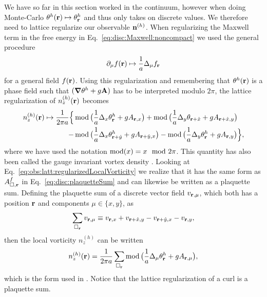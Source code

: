 We have so far in this section worked in the continuum, however when doing Monte-Carlo
$\theta^h({\boldsymbol{\mathbf{r}}}) \mapsto \theta^h_{\boldsymbol{\mathbf{r}}}$ and thus only takes on discrete values. 
We therefore need to lattice regularize our observable ${\boldsymbol{\mathbf{n}}}^{(h)}$. When regularizing
the Maxwell term in the free energy in Eq.~\eqref{eq:disc:Maxwell:noncompact} we used the general
procedure
\begin{equation}
  \partial_\mu f({\boldsymbol{\mathbf{r}}}) \mapsto \frac{1}{a}\Delta_\mu f_{\boldsymbol{\mathbf{r}}}
  \label{eq:obs:latt:gradientRegularization}
\end{equation}
for a general field $f({\boldsymbol{\mathbf{r}}})$.
Using this regularization and remembering that $\theta^h({\boldsymbol{\mathbf{r}}})$ is a phase field such that 
$({\boldsymbol{\mathbf{\nabla}}}\theta^h + g{\boldsymbol{\mathbf{A}}})$ has to be interpreted modulo $2\pi$, the lattice regularization of $n_z^{(h)}({\boldsymbol{\mathbf{r}}})$ becomes
\begin{equation}
  \begin{split}
	n_z^{(h)}({\boldsymbol{\mathbf{r}}}) \mapsto \frac{1}{2\pi a}\Big\{&\operatorname{mod}\big(\frac{1}{a}\Delta_x\theta^h_{\boldsymbol{\mathbf{r}}} + gA_{{\boldsymbol{\mathbf{r}}},x}\big) + \operatorname{mod}\big(\frac{1}{a}\Delta_y\theta_{{\boldsymbol{\mathbf{r}}}+\hat{x}} + gA_{{\boldsymbol{\mathbf{r}}}+\hat{x},y}\big)\\
	-&\operatorname{mod}\big(\frac{1}{a}\Delta_x\theta^h_{{\boldsymbol{\mathbf{r}}}+\hat{y}} + gA_{{\boldsymbol{\mathbf{r}}}+\hat{y},x}\big) - \operatorname{mod}\big(\frac{1}{a}\Delta_y\theta^h_{\boldsymbol{\mathbf{r}}} + gA_{{\boldsymbol{\mathbf{r}}},y}\big)\Big\},
  \end{split}
  \label{eq:obs:latt:regularizedLocalVorticity}
\end{equation}
where we have used the notation $\operatorname{mod}(x) = x\mod2\pi$. This quantity has also been called the gauge invariant vortex density \cite{shimizu12}.
Looking at Eq.~\eqref{eq:obs:latt:regularizedLocalVorticity} we realize that it has the same form as $A^f_{\Box,{\boldsymbol{\mathbf{r}}}}$ in Eq.~\eqref{eq:disc:plaquetteSum}
and can likewise be written as a plaquette sum. Defining the plaquette sum of a discrete vector field $v_{{\boldsymbol{\mathbf{r}}},\mu}$, which both has a position ${\boldsymbol{\mathbf{r}}}$ and components $\mu\in\{x,y\}$, as
\begin{equation}
  \sum_{\Box_{\boldsymbol{\mathbf{r}}}}v_{{\boldsymbol{\mathbf{r}}},\mu} \equiv v_{{\boldsymbol{\mathbf{r}}},x} + v_{{\boldsymbol{\mathbf{r}}}+\hat{x},y} - v_{{\boldsymbol{\mathbf{r}}}+\hat{y},x} - v_{{\boldsymbol{\mathbf{r}}},y},
  \label{eq:obs:latt:plaquetteSum}
\end{equation}
then the local vorticity $n_z^{(h)}$ can be written
\begin{equation}
  n_z^{(h)}({\boldsymbol{\mathbf{r}}}) = \frac{1}{2\pi a}\sum_{\Box_{\boldsymbol{\mathbf{r}}}}\operatorname{mod}\big(\frac{1}{a}\Delta_\mu\theta^h_{\boldsymbol{\mathbf{r}}} + gA_{{\boldsymbol{\mathbf{r}}},\mu}\big),
  \label{eq:obs:latt:shortNotationLocalVorticity}
\end{equation}
which is the form used in \cite{Kragset08}. Notice that the lattice regularization of a curl is a plaquette sum.

